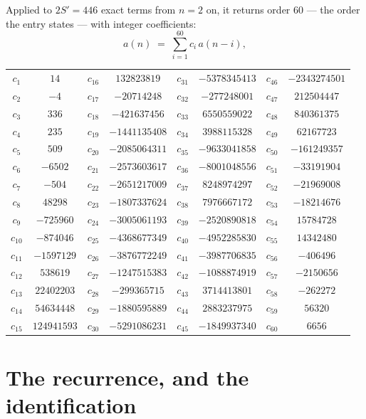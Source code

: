 \documentclass[11pt,a4paper]{article}
\theoremstyle{plain}
\theoremstyle{definition}
\begin{document}
Applied to $2S'=446$ exact terms from $n=2$ on, it returns order $60$ --- the
order the entry states --- with integer coefficients:
\[
a(n)\;=\;\sum_{i=1}^{60}c_i\,a(n-i),
\]
\begin{center}\small
\begin{tabular}{cccccccc}
$c_{1}$ & $14$ & $c_{16}$ & $132823819$ & $c_{31}$ & $-5378345413$ & $c_{46}$ & $-2343274501$ \\
$c_{2}$ & $-4$ & $c_{17}$ & $-20714248$ & $c_{32}$ & $-277248001$ & $c_{47}$ & $212504447$ \\
$c_{3}$ & $336$ & $c_{18}$ & $-421637456$ & $c_{33}$ & $6550559022$ & $c_{48}$ & $840361375$ \\
$c_{4}$ & $235$ & $c_{19}$ & $-1441135408$ & $c_{34}$ & $3988115328$ & $c_{49}$ & $62167723$ \\
$c_{5}$ & $509$ & $c_{20}$ & $-2085064311$ & $c_{35}$ & $-9633041858$ & $c_{50}$ & $-161249357$ \\
$c_{6}$ & $-6502$ & $c_{21}$ & $-2573603617$ & $c_{36}$ & $-8001048556$ & $c_{51}$ & $-33191904$ \\
$c_{7}$ & $-504$ & $c_{22}$ & $-2651217009$ & $c_{37}$ & $8248974297$ & $c_{52}$ & $-21969008$ \\
$c_{8}$ & $48298$ & $c_{23}$ & $-1807337624$ & $c_{38}$ & $7976667172$ & $c_{53}$ & $-18214676$ \\
$c_{9}$ & $-725960$ & $c_{24}$ & $-3005061193$ & $c_{39}$ & $-2520890818$ & $c_{54}$ & $15784728$ \\
$c_{10}$ & $-874046$ & $c_{25}$ & $-4368677349$ & $c_{40}$ & $-4952285830$ & $c_{55}$ & $14342480$ \\
$c_{11}$ & $-1597129$ & $c_{26}$ & $-3876772249$ & $c_{41}$ & $-3987706835$ & $c_{56}$ & $-406496$ \\
$c_{12}$ & $538619$ & $c_{27}$ & $-1247515383$ & $c_{42}$ & $-1088874919$ & $c_{57}$ & $-2150656$ \\
$c_{13}$ & $22402203$ & $c_{28}$ & $-299365715$ & $c_{43}$ & $3714413801$ & $c_{58}$ & $-262272$ \\
$c_{14}$ & $54634448$ & $c_{29}$ & $-1880595889$ & $c_{44}$ & $2883237975$ & $c_{59}$ & $56320$ \\
$c_{15}$ & $124941593$ & $c_{30}$ & $-5291086231$ & $c_{45}$ & $-1849937340$ & $c_{60}$ & $6656$ \\
\end{tabular}
\end{center}

\section{The recurrence, and the identification}
\end{document}
